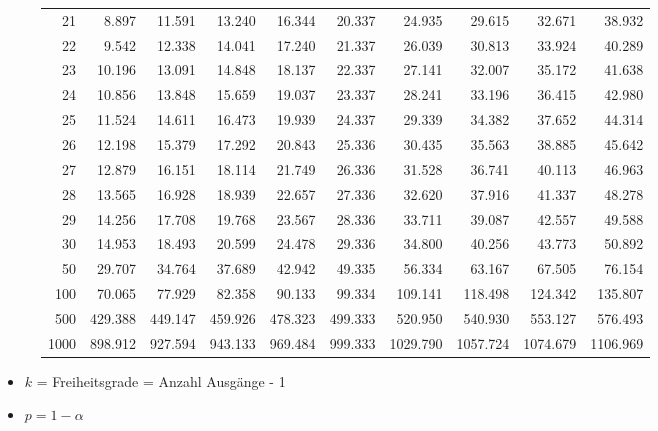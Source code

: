 \begin{figure}[h!]
\begin{center}
\begin{tabular}{|r|rrr|rrr|rrr|}
21&8.897&11.591&13.240&16.344&20.337&24.935&29.615&32.671&38.932\\
22&9.542&12.338&14.041&17.240&21.337&26.039&30.813&33.924&40.289\\
23&10.196&13.091&14.848&18.137&22.337&27.141&32.007&35.172&41.638\\
24&10.856&13.848&15.659&19.037&23.337&28.241&33.196&36.415&42.980\\
25&11.524&14.611&16.473&19.939&24.337&29.339&34.382&37.652&44.314\\
26&12.198&15.379&17.292&20.843&25.336&30.435&35.563&38.885&45.642\\
27&12.879&16.151&18.114&21.749&26.336&31.528&36.741&40.113&46.963\\
28&13.565&16.928&18.939&22.657&27.336&32.620&37.916&41.337&48.278\\
29&14.256&17.708&19.768&23.567&28.336&33.711&39.087&42.557&49.588\\
30&14.953&18.493&20.599&24.478&29.336&34.800&40.256&43.773&50.892\\
50&29.707&34.764&37.689&42.942&49.335&56.334&63.167&67.505&76.154\\
100&70.065&77.929&82.358&90.133&99.334&109.141&118.498&124.342&135.807\\
500&429.388&449.147&459.926&478.323&499.333&520.950&540.930&553.127&576.493\\
1000&898.912&927.594&943.133&969.484&999.333&1029.790&1057.724&1074.679&1106.969\\
\hline
\end{tabular}
\end{center}
\end{figure}

\begin{itemize}
  \item $k$ = Freiheitsgrade = Anzahl Ausgänge - 1
  \item $p = 1 - \alpha$
\end{itemize}

\pagebreak
